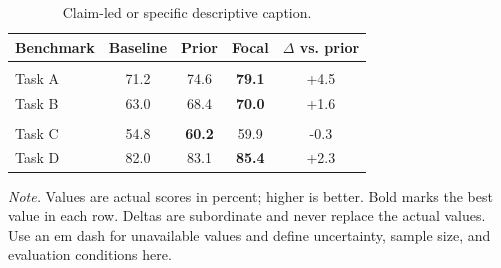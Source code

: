 %
%
%

\begin{table}[t]
  \centering
  \begin{threeparttable}
    \caption{Claim-led or specific descriptive caption.}
    \label{tab:openai_style_example}
    \setlength{\tabcolsep}{5.0pt}
    \renewcommand{\arraystretch}{1.24}
    \begin{tabularx}{\linewidth}{
      @{}
      >{\raggedright\arraybackslash}X
      S[table-format=2.1]
      S[table-format=2.1]
      S[table-format=2.1]
      S[table-format=+2.1]
      @{}
    }
      \toprule
      \textbf{Benchmark} &
      {\textbf{Baseline}} &
      {\textbf{Prior}} &
      {\textbf{Focal}} &
      {\textbf{$\Delta$ vs. prior}} \\
      \midrule
       \\
      Task A & 71.2 & 74.6 & \bfseries 79.1 & +4.5 \\
      Task B & 63.0 & 68.4 & \bfseries 70.0 & +1.6 \\
      \addlinespace[3pt]
      \cmidrule(lr){1-5}
       \\
      Task C & 54.8 & \bfseries 60.2 & 59.9 & -0.3 \\
      Task D & 82.0 & 83.1 & \bfseries 85.4 & +2.3 \\
      \bottomrule
    \end{tabularx}
    \begin{tablenotes}[flushleft]
      \footnotesize
      \item \textit{Note.} Values are actual scores in percent; higher is better.
      Bold marks the best value in each row. Deltas are subordinate and never
      replace the actual values. Use an em dash for unavailable values and
      define uncertainty, sample size, and evaluation conditions here.
    \end{tablenotes}
  \end{threeparttable}
\end{table}

